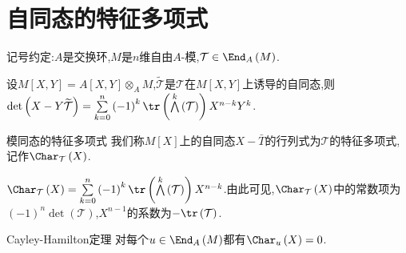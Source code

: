 \section{自同态的特征多项式}

记号约定:$A$是交换环,$M$是$n$维自由$A$-模,$\mathcal{T}\in\End_{A}\left(M\right)$.

\begin{proposition}{}{}
	设$M\left[X,Y\right]=A\left[X,Y\right]\otimes_{A}M$,$\widetilde{\mathcal{T}}$是$\mathcal{T}$在$M\left[X,Y\right]$上诱导的自同态,则$\det\left(X-Y\widetilde{\mathcal{T}}\right)=\sum\limits_{k=0}^{n}\left(-1\right)^{k}\tr\left(\bigwedge\limits^{k}\left(\mathcal{T}\right)\right)X^{n-k}Y^{k}$.
\end{proposition}

\begin{definition}{模同态的特征多项式}{}
	我们称$M\left[X\right]$上的自同态$X-\bar{T}$的行列式为$\mathcal{T}$的特征多项式,记作$\Char_{\mathcal{T}}\left(X\right)$.
\end{definition}

\begin{remark}{}{}
	$\Char_{\mathcal{T}}\left(X\right)=\sum\limits_{k=0}^{n}\left(-1\right)^{k}\tr\left(\bigwedge\limits^{k}\left(\mathcal{T}\right)\right)X^{n-k}$.由此可见,$\Char_{\mathcal{T}}\left(X\right)$中的常数项为$\left(-1\right)^{n}\det\left(\mathcal{T}\right)$,$X^{n-1}$的系数为$-\tr\left(\mathcal{T}\right)$.
\end{remark}

\begin{proposition}{Cayley-Hamilton定理}{}
	对每个$u\in\End_{A}\left(M\right)$都有$\Char_{u}\left(X\right)=0$.
\end{proposition}


